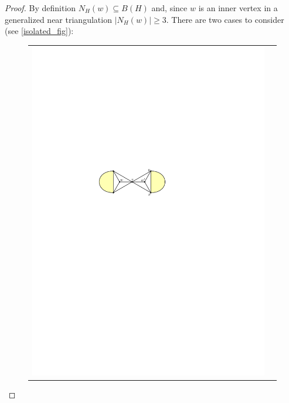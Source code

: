 \documentclass[12pt]{article}
\theoremstyle{definition}
\begin{document}
\begin{proof}
  By definition $N_H(w)\subseteq B(H)$ and, since $w$ is an inner vertex in a generalized near triangulation $|N_H(w)|\ge 3$. There are two cases to consider (see \cref{isolated_fig}):
  \begin{figure}[htpb]
    \centering
    \begin{tabular}{cc}
      \includegraphics[page=1]{figs/isolated} &

\end{tabular}
\end{figure}
\end{proof}
\end{document}
